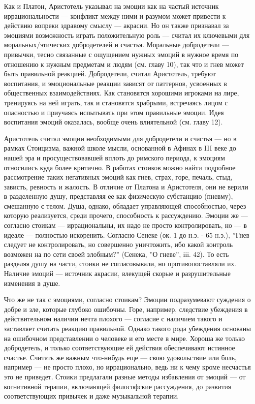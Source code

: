 \documentclass[11pt]{book}
\begin{document}
Как и Платон, Аристотель указывал на эмоции как на частый источник иррациональности --- конфликт между ними и разумом может привести к действию вопреки здравому смыслу --- акрасии. Но он также признавал за эмоциями возможность играть положительную роль --- считал их ключевыми для моральных/этических добродетелей и счастья. Моральные добродетели --- привычки, тесно связанные с ощущением нужных эмоций в нужное время по отношению к нужным предметам и людям (см. главу 10), так что и гнев может быть правильной реакцией. Добродетели, считал Аристотель, требуют воспитания, и эмоциональные реакции зависят от паттернов, усвоенных в общественных взаимодействиях. Как становятся хорошими игроками на лире, тренируясь на ней играть, так и становятся храбрыми, встречаясь лицом с опасностью и приучаясь испытывать при этом правильные эмоции. Идея воспитания эмоций оказалась, вообще очень влиятельной (см. главу 12).

Аристотель считал эмоции необходимыми для добродетели и счастья --- но в рамках Стоицизма, важной школе мысли, основанной в Афинах в III веке до нашей эра и просуществовавшей вплоть до римского периода, к эмоциям относились куда более критично. В работах стоиков можно найти подробное рассмотрение таких негативных эмоций как гнев, страх, горе, печаль, стыд, зависть, ревность и жалость. В отличие от Платона и Аристотеля, они не верили в разделенную душу, представляя ее как физическую субстанцию (пневму), смешанную с телом. Душа, однако, обладает управляющей способностью, через которую реализуется, среди прочего, способность к рассуждению. Эмоции же --- согласно стоикам --- иррациональны, их надо не просто контролировать, но --- в идеале --- полностью искоренить. Согласно Сенеке (ок. 1 до н.э. - 65 н.э.), ''Гнев следует не контролировать, но совершенно уничтожить, ибо какой контроль возможен на по сети своей злобным?'' (Сенека, ''О гневе'', iii. 42). То есть разделяя душу на части, стоики не согласовывали, но противопоставляли их. Наличие эмоций --- источник акрасии, влекущей скорые и разрушительные изменения в душе.

Что же не так с эмоциями, согласно стоикам? Эмоции подразумевают суждения о добре и зле, которые глубоко ошибочны. Горе, например, следствие убеждения в действительном наличии нечта плохого --- согласие с наличием такого и заставляет считать реакцию правильной. Однако такого рода убеждения основаны на ошибочном представлении о человеке и его месте в мире. Хороша же только добродетель, и только соответствующие ей действия обеспечивают истинное счастье. Считать же важным что-нибудь еще --- свою удовольствие или боль, например --- не просто плохо, но иррационально, ведь ни к чему кроме несчастья это не приведет. Стоики предлагали разные методы избавления от эмоций --- от когнитивной терапии, включающей философские рассуждения, до развития соответствующих привычек и даже музыкальной терапии.
\end{document}
